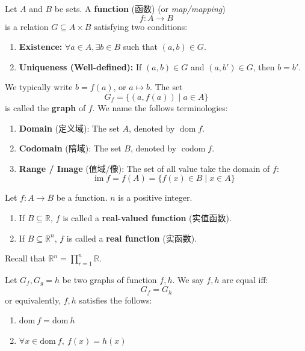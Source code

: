 \documentclass[
	UTF-8,
	11pt, %
	a4paper, %
]{LegrandOrangeBook}
\begin{document}
\begin{definition}[Function]
Let $A$ and $B$ be sets. A \textbf{function} (函数) (or \textit{map/mapping}) 
$$f: A \to B$$ 
is a relation $G \subseteq A \times B$ satisfying two conditions:
\begin{enumerate}
    \item \textbf{Existence:} $\forall a \in A, \exists b \in B$ such that $(a, b) \in G$.
    \item \textbf{Uniqueness (Well-defined):} If $(a, b) \in G$ and $(a, b') \in G$, then $b = b'$.
\end{enumerate}
We typically write $b = f(a)$, or $a \longmapsto b $.
The set $$G_f = \{(a, f(a)) \mid a \in A\}$$ 
is called the \textbf{graph} of $f$. We name the follows terminologies:
\begin{enumerate}
    \item \textbf{Domain} (定义域): The set $A$, denoted by $\operatorname{dom} f$.
    \item \textbf{Codomain} (陪域): The set $B$, denoted by $\operatorname{codom} f$.
    \item \textbf{Range / Image} (值域/像): The set of all value take the domain of $f$:
    $$ \operatorname{im} f = f(A) = \{ f(x) \in B \mid x \in A \} $$
\end{enumerate}
\end{definition}

\begin{definition}
    

    Let $f:A \to B$ be a function. $n$ is a positive integer.
    \begin{enumerate}
        \item If $B \subseteq \mathbb{R}$, $f$ is called a \textbf{real-valued function} (实值函数).
        \item If $B \subseteq \mathbb{R}^n$, $f$ is called a \textbf{real function} (实函数).
    \end{enumerate}

\end{definition}

\begin{remark}
    Recall that $\mathbb{R}^n = \displaystyle\prod_{r=1}^{n}\mathbb{R}$.
\end{remark}

\newcommand{\domain}{\mathrm{dom}\ }

\begin{definition}
    Let $G_f, G_g=h$ be two graphs of function $f, h$. We say $f, h$ are equal iff:
        $$G_f = G_h$$
    or equivalently, $f, h$ satisfies the follows:
    \begin{enumerate}
        \item $\domain f = \domain h$
        \item $\forall x \in \domain f ,\ f(x) = h(x) $
    \end{enumerate}
    
\end{definition}
\end{document}
